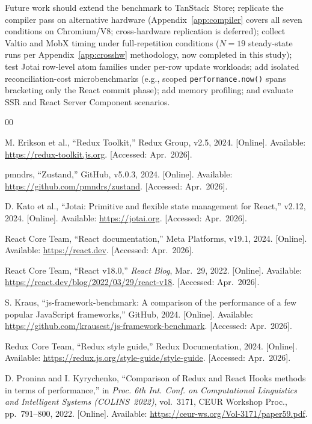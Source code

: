 \documentclass[conference]{IEEEtran}
\newcommand{\code}[1]{\texttt{\small #1}}
\begin{document}
Future work should extend the benchmark to TanStack~Store;
replicate the compiler pass on alternative hardware
(Appendix~\ref{app:compiler} covers all seven conditions on
Chromium/V8; cross-hardware replication is deferred); collect Valtio and MobX timing under
full-repetition conditions ($N{=}19$ steady-state runs per
Appendix~\ref{app:crosshw} methodology, now completed in this study); test Jotai row-level atom
families under per-row update workloads; add isolated
reconciliation-cost microbenchmarks (e.g., scoped
\code{performance.now()} spans bracketing only the React commit
phase); add memory profiling;
and evaluate SSR and React Server Component scenarios.

\begin{thebibliography}{00}

M. Erikson et al., ``Redux Toolkit,'' Redux Group, v2.5, 2024.
[Online]. Available: \url{https://redux-toolkit.js.org}.
[Accessed: Apr.~2026].

pmndrs, ``Zustand,'' GitHub, v5.0.3, 2024.
[Online]. Available: \url{https://github.com/pmndrs/zustand}.
[Accessed: Apr.~2026].

D. Kato et al., ``Jotai: Primitive and flexible state management for
React,'' v2.12, 2024.
[Online]. Available: \url{https://jotai.org}.
[Accessed: Apr.~2026].

React Core Team, ``React documentation,'' Meta Platforms, v19.1, 2024.
[Online]. Available: \url{https://react.dev}.
[Accessed: Apr.~2026].

React Core Team, ``React v18.0,'' \textit{React Blog}, Mar.~29, 2022.
[Online]. Available: \url{https://react.dev/blog/2022/03/29/react-v18}.
[Accessed: Apr.~2026].

S. Kraus, ``js-framework-benchmark: A comparison of the performance
of a few popular JavaScript frameworks,'' GitHub, 2024.
[Online]. Available: \url{https://github.com/krausest/js-framework-benchmark}.
[Accessed: Apr.~2026].

Redux Core Team, ``Redux style guide,'' Redux Documentation, 2024.
[Online]. Available: \url{https://redux.js.org/style-guide/style-guide}.
[Accessed: Apr.~2026].

D. Pronina and I. Kyrychenko, ``Comparison of Redux and React Hooks
methods in terms of performance,'' in \textit{Proc. 6th Int. Conf. on
Computational Linguistics and Intelligent Systems (COLINS~2022)},
vol.~3171, CEUR Workshop Proc., pp.~791--800, 2022.
[Online]. Available: \url{https://ceur-ws.org/Vol-3171/paper59.pdf}.


\end{thebibliography}
\end{document}
